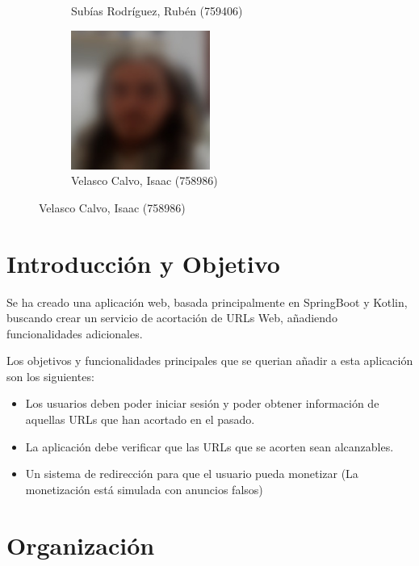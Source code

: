\documentclass{article}
\begin{document}
\begin{figure}[H]
\begin{subfigure}[b]{0.49\textwidth}
		  \caption*{Subías Rodríguez, Rubén (759406)}
	  \end{subfigure}
	  \hfill
	  \begin{subfigure}[b]{0.49\textwidth}
		  \centering
		  \includegraphics[width=0.5\textwidth]{../images/Isaac.jpeg}
		  \caption*{Velasco Calvo, Isaac (758986)}
	  \end{subfigure}
 
	 \end{figure}
 
\pagebreak

\section {Introducción y Objetivo}

Se ha creado una aplicación web, basada principalmente en SpringBoot\cite{springboot} y Kotlin\cite{kotlin}, buscando crear un servicio de acortación de URLs Web, añadiendo funcionalidades adicionales.

Los objetivos y funcionalidades principales que se querian añadir a esta aplicación son los siguientes:

\begin{itemize}
	 \item Los usuarios deben poder iniciar sesión y poder obtener información de aquellas
	 URLs que han acortado en el pasado.
	 \item La aplicación debe verificar que las URLs que se acorten sean alcanzables.
	 \item Un sistema de redirección para que el usuario pueda monetizar (La monetización está simulada con anuncios falsos)
\end{itemize}

\section {Organización}
\end{document}
